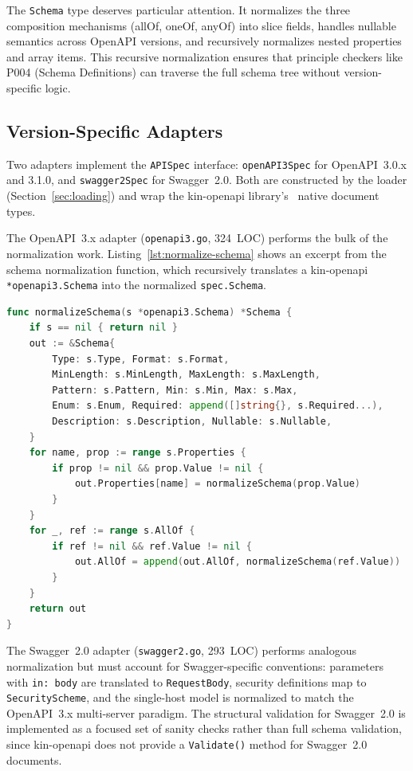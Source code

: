 The \texttt{Schema} type deserves particular attention. It normalizes the three composition mechanisms (allOf, oneOf, anyOf) into slice fields, handles nullable semantics across OpenAPI versions, and recursively normalizes nested properties and array items. This recursive normalization ensures that principle checkers like P004 (Schema Definitions) can traverse the full schema tree without version-specific logic.

\subsection{Version-Specific Adapters}
\label{subsec:version-adapters}

Two adapters implement the \texttt{APISpec} interface: \texttt{openAPI3Spec} for OpenAPI~3.0.x and 3.1.0, and \texttt{swagger2Spec} for Swagger~2.0. Both are constructed by the loader (Section~\ref{sec:loading}) and wrap the kin-openapi library's~\cite{kin-openapi} native document types.

The OpenAPI~3.x adapter (\texttt{openapi3.go}, 324~LOC) performs the bulk of the normalization work. Listing~\ref{lst:normalize-schema} shows an excerpt from the schema normalization function, which recursively translates a kin-openapi \texttt{*openapi3.Schema} into the normalized \texttt{spec.Schema}.

\begin{lstlisting}[language=Go,caption={Schema normalization excerpt (\texttt{spec/openapi3.go}).},label={lst:normalize-schema}]
func normalizeSchema(s *openapi3.Schema) *Schema {
    if s == nil { return nil }
    out := &Schema{
        Type: s.Type, Format: s.Format,
        MinLength: s.MinLength, MaxLength: s.MaxLength,
        Pattern: s.Pattern, Min: s.Min, Max: s.Max,
        Enum: s.Enum, Required: append([]string{}, s.Required...),
        Description: s.Description, Nullable: s.Nullable,
    }
    for name, prop := range s.Properties {
        if prop != nil && prop.Value != nil {
            out.Properties[name] = normalizeSchema(prop.Value)
        }
    }
    for _, ref := range s.AllOf {
        if ref != nil && ref.Value != nil {
            out.AllOf = append(out.AllOf, normalizeSchema(ref.Value))
        }
    }
    return out
}
\end{lstlisting}

The Swagger~2.0 adapter (\texttt{swagger2.go}, 293~LOC) performs analogous normalization but must account for Swagger-specific conventions: parameters with \texttt{in: body} are translated to \texttt{RequestBody}, security definitions map to \texttt{SecurityScheme}, and the single-host model is normalized to match the OpenAPI~3.x multi-server paradigm. The structural validation for Swagger~2.0 is implemented as a focused set of sanity checks rather than full schema validation, since kin-openapi does not provide a \texttt{Validate()} method for Swagger~2.0 documents.


